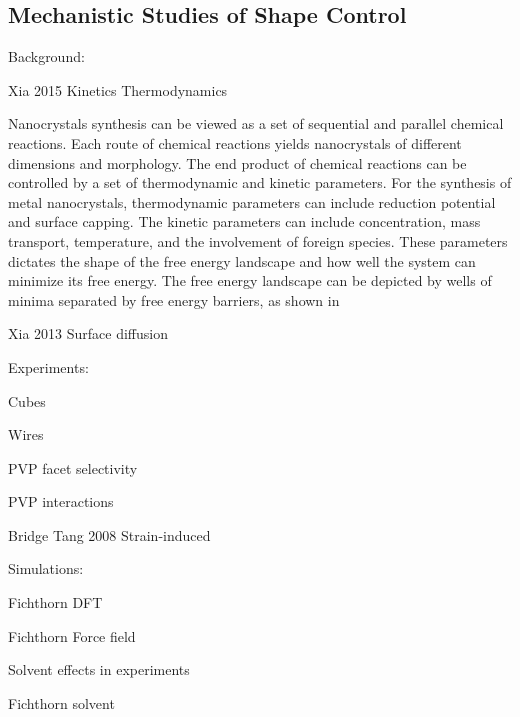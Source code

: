 \subsection{Mechanistic Studies of Shape Control}

Background:

Xia 2015 Kinetics Thermodynamics

Nanocrystals synthesis can be viewed as a set of sequential and parallel chemical reactions.
Each route of chemical reactions yields nanocrystals of different dimensions and morphology.
The end product of chemical reactions can be controlled by a set of thermodynamic and kinetic parameters.
For the synthesis of metal nanocrystals, thermodynamic parameters can include reduction potential and surface capping.
The kinetic parameters can include concentration, mass transport, temperature, and the involvement of foreign species.
These parameters dictates the shape of the free energy landscape and how well the system can minimize its free energy.
The free energy landscape can be depicted by wells of minima separated by free energy barriers, as shown in 

Xia 2013 Surface diffusion

Experiments:

Cubes

Wires

PVP facet selectivity

PVP interactions

Bridge Tang 2008 Strain-induced

Simulations:

Fichthorn DFT

Fichthorn Force field

Solvent effects in experiments

Fichthorn solvent
  
  